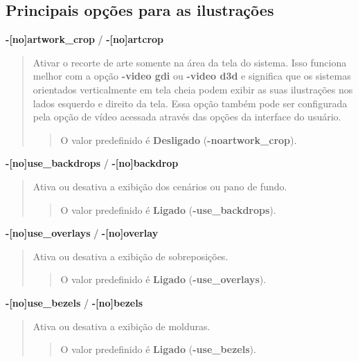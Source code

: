 \documentclass[letterpaper,10pt,brazil]{sphinxmanual}
\begin{document}
\subsection{Principais opções para as ilustrações}
\label{commandline/commandline-all:principais-opcoes-para-as-ilustracoes}\label{commandline/commandline-all:mame-commandline-noartworkcrop}
\textbf{-{[}no{]}artwork\_crop} / \textbf{-{[}no{]}artcrop}
\begin{quote}

Ativar o recorte de arte somente na área da tela do sistema. Isso
funciona melhor com a opção \textbf{-video gdi} ou \textbf{-video d3d}
e significa que os sistemas orientados verticalmente em tela cheia
podem exibir as suas ilustrações nos lados esquerdo e direito da
tela. Essa opção também pode ser configurada pela opção de vídeo
acessada através das opções da interface do usuário.
\begin{quote}

O valor predefinido é \textbf{Desligado} (\textbf{-noartwork\_crop}).
\end{quote}
\end{quote}
\label{commandline/commandline-all:mame-commandline-nousebackdrops}
\textbf{-{[}no{]}use\_backdrops} / \textbf{-{[}no{]}backdrop}
\begin{quote}

Ativa ou desativa a exibição dos cenários ou pano de fundo.
\begin{quote}

O valor predefinido é \textbf{Ligado} (\textbf{-use\_backdrops}).
\end{quote}
\end{quote}
\label{commandline/commandline-all:mame-commandline-nouseoverlays}
\textbf{-{[}no{]}use\_overlays} / \textbf{-{[}no{]}overlay}
\begin{quote}

Ativa ou desativa a exibição de sobreposições.
\begin{quote}

O valor predefinido é \textbf{Ligado} (\textbf{-use\_overlays}).
\end{quote}
\end{quote}
\label{commandline/commandline-all:mame-commandline-nousebezels}
\textbf{-{[}no{]}use\_bezels} / \textbf{-{[}no{]}bezels}
\begin{quote}

Ativa ou desativa a exibição de molduras.
\begin{quote}

O valor predefinido é \textbf{Ligado} (\textbf{-use\_bezels}).
\end{quote}
\end{quote}
\end{document}
